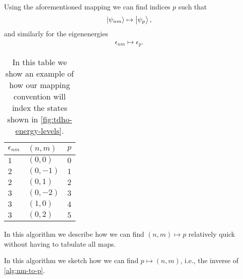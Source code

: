             Using the aforementioned mapping we can find indices $p$ such that
            \begin{align}
                \ket{\psi_{nm}} \mapsto \ket{\psi_p},
            \end{align}
            and similarly for the eigenenergies
            \begin{align}
                \epsilon_{nm} \mapsto \epsilon_{p}.
            \end{align}

            \begin{table}
                \centering
                \caption{In this table we show an example of how our mapping
                convention will index the states shown in
                \autoref{fig:tdho-energy-levels}.}
                \renewcommand{\arraystretch}{1.3}
                \begin{tabular}{@{}lll@{}}
                    \toprule
                    $\epsilon_{nm}$ & $(n, m)$ & $p$ \\
                    \midrule
                    $1$ & $(0, 0)$ & $0$ \\
                    $2$ & $(0, -1)$ & $1$ \\
                    $2$ & $(0, 1)$ & $2$ \\
                    $3$ & $(0, -2)$ & $3$ \\
                    $3$ & $(1, 0)$ & $4$ \\
                    $3$ & $(0, 2)$ & $5$ \\
                    \bottomrule
                \end{tabular}
                \label{tab:tdho-mapping}
            \end{table}

            \begin{algorithm}
                \caption{In this algorithm we describe how we can find $(n, m)
                \mapsto p$ relatively quick without having to tabulate all
                maps.}
                \label{alg:nm-to-p}
            \end{algorithm}

            \begin{algorithm}
                \caption{In this algorithm we sketch how we can find $p \mapsto
                (n, m)$, i.e., the inverse of \autoref{alg:nm-to-p}.}
                \label{alg:p-to-nm}
            \end{algorithm}

